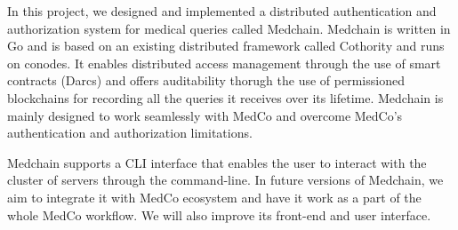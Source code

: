 In this project, we designed and implemented a distributed authentication and authorization system for medical queries called Medchain. Medchain is written in Go and is based on an existing distributed framework called Cothority and runs on conodes. It enables distributed access management through the use of smart contracts (Darcs) and offers auditability thorugh the use of permissioned blockchains for recording all the queries it receives over its lifetime. Medchain is mainly designed to work seamlessly with MedCo and overcome MedCo's authentication and authorization limitations.

Medchain supports a CLI interface that enables the user to interact with the cluster of servers through the command-line. In future versions of Medchain, we aim to integrate it with MedCo ecosystem and have it work as a part of the whole MedCo workflow. We will also improve its front-end and user interface.    
